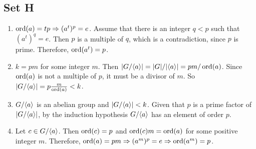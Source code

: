 \subsection{Set H}
\begin{enumerate}
    \item $\operatorname{ord}(a) = tp \Rightarrow (a^t)^p = e$. Assume that there is an integer $q < p$ such that $(a^t)^q = e$. Then $p$ is a multiple of $q$, which is a contradiction, since $p$ is prime. Therefore, $\operatorname{ord}(a^t) = p$.
    \item $k = pm$ for some integer $m$. Then $|G/\langle a\rangle| = |G|/|\langle a\rangle| = pm/\operatorname{ord}(a)$. Since $\operatorname{ord}(a)$ is not a multiple of $p$, it must be a divisor of $m$. So $|G/\langle a\rangle| = p\frac{m}{\operatorname{ord}(a)} < k$.
    \item $G/\langle a\rangle$ is an abelian group and $|G/\langle a\rangle| < k$. Given that $p$ is a prime factor of $|G/\langle a\rangle|$, by the induction hypothesis $G/\langle a\rangle$ has an element of order $p$.
    \item Let $c \in G/\langle a\rangle$. Then $\operatorname{ord}(c) = p$ and $\operatorname{ord}(c)m = \operatorname{ord}(a)$ for some positive integer $m$. Therefore, $\operatorname{ord}(a) = pm \Rightarrow (a^m)^p = e \Rightarrow \operatorname{ord}(a^m) = p$.
\end{enumerate}    
